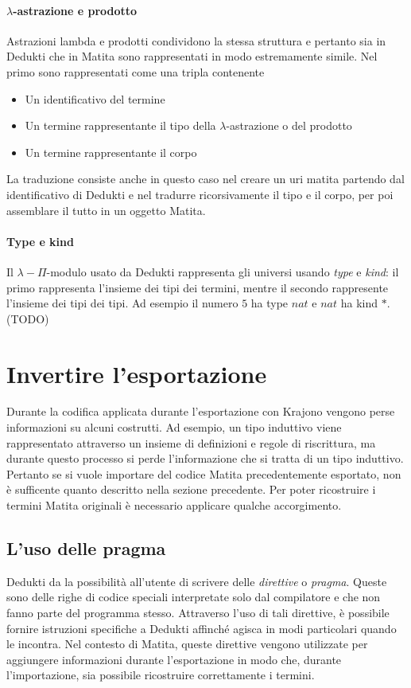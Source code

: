 \documentclass[12pt,a4paper]{mimosis}
\begin{document}
\paragraph{$\lambda$-astrazione e prodotto}
Astrazioni lambda e prodotti condividono la stessa struttura e pertanto sia in Dedukti
che in Matita sono rappresentati in modo estremamente simile.
Nel primo sono rappresentati come una tripla contenente
\begin{itemize}
  \item Un identificativo del termine
  \item Un termine rappresentante il tipo della $\lambda$-astrazione o del prodotto
  \item Un termine rappresentante il corpo
\end{itemize}
La traduzione consiste anche in questo caso nel creare un uri matita partendo dal
identificativo di Dedukti e nel tradurre ricorsivamente il tipo e il corpo, per
poi assemblare il tutto in un oggetto Matita.

\paragraph{Type e kind}
Il $\lambda-\Pi$-modulo usato da Dedukti rappresenta gli universi usando
\textit{type} e \textit{kind}: il primo rappresenta l'insieme dei tipi
dei termini, mentre il secondo rappresente l'insieme dei tipi dei tipi.
Ad esempio il numero $5$ ha type $nat$ e $nat$ ha kind $*$.  (TODO)

\section{Invertire l'esportazione}
Durante la codifica applicata durante l'esportazione con Krajono vengono perse
informazioni su alcuni costrutti. Ad esempio, un tipo induttivo viene rappresentato
attraverso un insieme di definizioni e regole di riscrittura, ma durante questo processo
si perde l'informazione che si tratta di un tipo induttivo. Pertanto se si vuole 
importare del codice Matita precedentemente esportato, non è sufficente quanto descritto
nella sezione precedente. Per poter ricostruire i termini Matita originali è necessario
applicare qualche accorgimento.

\subsection{L'uso delle pragma}
Dedukti da la possibilità all'utente di scrivere delle \textit{direttive} o \textit{pragma}.
Queste sono delle righe di codice speciali interpretate solo dal compilatore 
e che non fanno parte del programma stesso. Attraverso l'uso di tali direttive,
è possibile fornire istruzioni specifiche a Dedukti affinché agisca in modi
particolari quando le incontra. Nel contesto di Matita, queste direttive vengono
utilizzate per aggiungere informazioni durante l'esportazione in modo che,
durante l'importazione, sia possibile ricostruire correttamente i termini.
\end{document}
